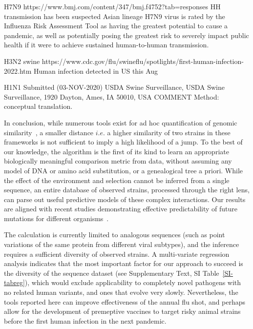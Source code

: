 \documentclass[onecolumn, compsoc,10pt]{IEEEtran}
\begin{document}
H7N9 https://www.bmj.com/content/347/bmj.f4752?tab=responses HH transmission has been suspected Asian lineage H7N9 virus is rated by the Influenza Risk Assessment Tool as having the greatest potential to cause a pandemic, as well as potentially posing the greatest risk to severely impact public health if it were to achieve sustained human-to-human transmission.

H3N2 swine https://www.cdc.gov/flu/swineflu/spotlights/first-human-infection-2022.htm Human infection detected in US this Aug

H1N1 Submitted (03-NOV-2020) USDA Swine Surveillance, USDA Swine Surveillance, 1920 Dayton, Ames, IA 50010, USA COMMENT Method: conceptual translation.

In conclusion, while numerous tools exist for ad hoc quantification of genomic similarity~\cite{posada1998modeltest,goldberger2005genomic,huelsenbeck1997phylogeny,neher2014predicting,VanderMeer2010,Smith2009}, a smaller  distance $i.e.$ a higher similarity of two strains in  these frameworks is not sufficient to imply a high likelihood of a jump. %
To the best of our knowledge, the \enet algorithm is  the first of its kind to learn an appropriate biologically meaningful comparison metric from data, without assuming any model of DNA or amino acid substitution, or a genealogical tree a priori. While the effect of the environment and selection cannot be inferred from a single sequence, an entire database of observed strains, processed through the right lens, can parse out useful predictive models of these complex interactions. Our results are  aligned with recent studies demonstrating effective  predictability of  future mutations  for different organisms~\cite{mollentze2021identifying,maher2021predicting}.
   
The \qdist calculation   is currently limited to analogous sequences (such as point variations of the same protein from different viral subtypes), and the \enet inference requires a  sufficient diversity of observed strains. A multi-variate regression analysis indicates  that the most important factor for our approach to succeed is  the diversity of the sequence dataset (see Supplementary Text, SI Table~\ref{SI-tabreg}), which would exclude applicability to completely novel pathogens with no related human variants, and ones that evolve very slowly. Nevertheless, the tools reported here can improve effectiveness of the annual flu shot, and perhaps allow for the development of premeptive vaccines to  target risky animal strains  before the first human infection in the next pandemic.
\end{document}
